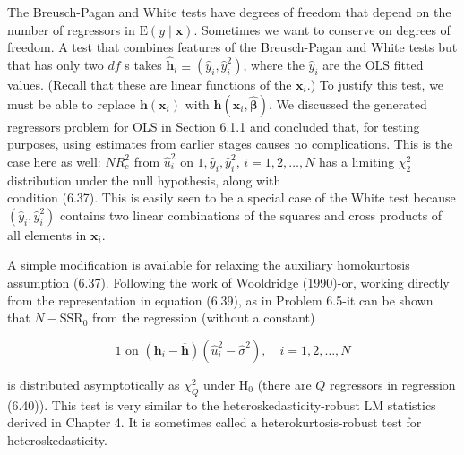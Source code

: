 \documentclass[10pt]{article}
\begin{document}
The Breusch-Pagan and White tests have degrees of freedom that depend on the number of regressors in $\mathrm{E}(y \mid \mathbf{x})$. Sometimes we want to conserve on degrees of freedom. A test that combines features of the Breusch-Pagan and White tests but that has only two $d f$ s takes $\hat{\mathbf{h}}_{i} \equiv\left(\hat{y}_{i}, \hat{y}_{i}^{2}\right)$, where the $\hat{y}_{i}$ are the OLS fitted values. (Recall that these are linear functions of the $\mathbf{x}_{i}$.) To justify this test, we must be able to replace $\mathbf{h}\left(\mathbf{x}_{i}\right)$ with $\mathbf{h}\left(\mathbf{x}_{i}, \hat{\boldsymbol{\beta}}\right)$. We discussed the generated regressors problem for OLS in Section 6.1.1 and concluded that, for testing purposes, using estimates from earlier stages causes no complications. This is the case here as well: $N R_{c}^{2}$ from $\hat{u}_{i}^{2}$ on $1, \hat{y}_{i}, \hat{y}_{i}^{2}$, $i=1,2, \ldots, N$ has a limiting $\chi_{2}^{2}$ distribution under the null hypothesis, along with\\
condition (6.37). This is easily seen to be a special case of the White test because $\left(\hat{y}_{i}, \hat{y}_{i}^{2}\right)$ contains two linear combinations of the squares and cross products of all elements in $\mathbf{x}_{i}$.

A simple modification is available for relaxing the auxiliary homokurtosis assumption (6.37). Following the work of Wooldridge (1990)-or, working directly from the representation in equation (6.39), as in Problem 6.5-it can be shown that $N-\mathrm{SSR}_{0}$ from the regression (without a constant)


\begin{equation*}
1 \text { on }\left(\mathbf{h}_{i}-\overline{\mathbf{h}}\right)\left(\hat{u}_{i}^{2}-\hat{\sigma}^{2}\right), \quad i=1,2, \ldots, N \tag{6.40}
\end{equation*}


is distributed asymptotically as $\chi_{Q}^{2}$ under $\mathrm{H}_{0}$ (there are $Q$ regressors in regression (6.40)). This test is very similar to the heteroskedasticity-robust LM statistics derived in Chapter 4. It is sometimes called a heterokurtosis-robust test for heteroskedasticity.
\end{document}

